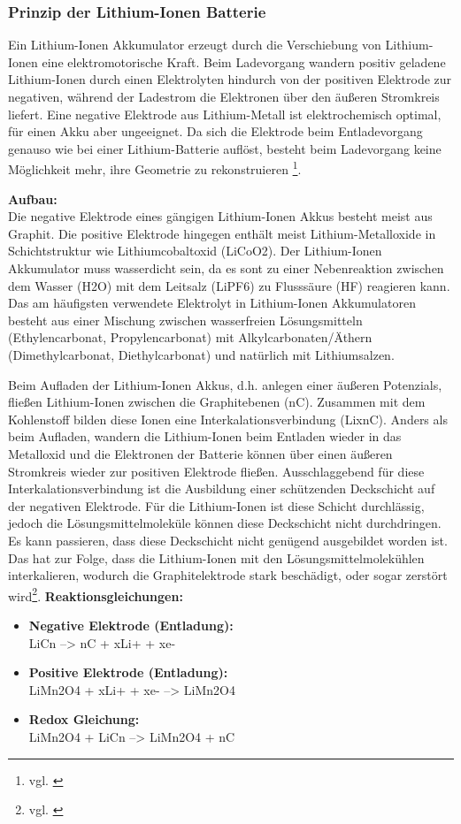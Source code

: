 \subsubsection{Prinzip der Lithium-Ionen Batterie}
Ein Lithium-Ionen Akkumulator erzeugt durch die Verschiebung von Lithium-Ionen eine elektromotorische Kraft.
Beim Ladevorgang wandern positiv geladene Lithium-Ionen durch einen Elektrolyten hindurch von der positiven Elektrode zur negativen, während der Ladestrom die Elektronen über den äußeren Stromkreis liefert. Eine negative Elektrode aus Lithium-Metall ist elektrochemisch optimal, für einen Akku aber ungeeignet. Da sich die Elektrode beim Entladevorgang genauso wie bei einer Lithium-Batterie auflöst, besteht beim Ladevorgang keine Möglichkeit mehr, ihre Geometrie zu rekonstruieren
\footnote{vgl. \cite{Lithium-Ionen-Akkumulator Prinzip}}.

\textbf{Aufbau:}\\
Die negative Elektrode eines gängigen Lithium-Ionen Akkus besteht meist aus Graphit. Die positive Elektrode hingegen enthält meist Lithium-Metalloxide in Schichtstruktur wie Lithiumcobaltoxid (LiCoO2). Der Lithium-Ionen Akkumulator muss wasserdicht sein, da es sont zu einer Nebenreaktion zwischen dem Wasser (H2O) mit dem Leitsalz (LiPF6) zu Flusssäure (HF) reagieren kann. Das am häufigsten verwendete Elektrolyt in Lithium-Ionen Akkumulatoren besteht aus einer Mischung zwischen wasserfreien Lösungsmitteln (Ethylencarbonat, Propylencarbonat) mit Alkylcarbonaten/Äthern (Dimethylcarbonat, Diethylcarbonat) und natürlich mit Lithiumsalzen.

Beim Aufladen der Lithium-Ionen Akkus, d.h. anlegen einer äußeren Potenzials, fließen Lithium-Ionen zwischen die Graphitebenen (nC). Zusammen mit dem Kohlenstoff bilden diese Ionen eine Interkalationsverbindung (LixnC). 
Anders als beim Aufladen, wandern die Lithium-Ionen beim Entladen wieder in das Metalloxid und die Elektronen der Batterie können über einen äußeren Stromkreis wieder zur positiven Elektrode fließen. 
Ausschlaggebend für diese Interkalationsverbindung ist die Ausbildung einer schützenden Deckschicht auf der negativen Elektrode. Für die Lithium-Ionen ist diese Schicht durchlässig, jedoch die Lösungsmittelmoleküle können diese Deckschicht nicht durchdringen. Es kann passieren, dass diese Deckschicht nicht genügend ausgebildet worden ist. Das hat zur Folge, dass die Lithium-Ionen mit den Lösungsmittelmolekühlen interkalieren, wodurch die Graphitelektrode stark beschädigt, oder sogar zerstört wird\footnote{vgl. \cite{Lithium-Ionen-Akkumulator Aufbau}}.
\newpage
\textbf{Reaktionsgleichungen:}
\begin{itemize}
	\item \textbf{Negative Elektrode (Entladung):}\\
	LiCn  -->  nC + xLi+ + xe-

	\item \textbf{Positive Elektrode (Entladung):}\\
	LiMn2O4 + xLi+ + xe-  -->  LiMn2O4

	\item \textbf{Redox Gleichung:}\\
	LiMn2O4 + LiCn  -->  LiMn2O4 + nC
\end{itemize}

